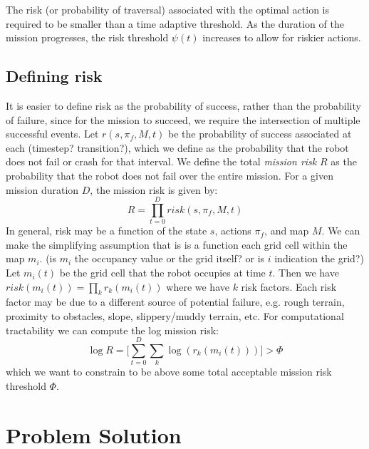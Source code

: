 \documentclass[letterpaper, 10 pt, conference]{ieeeconf}  %
\begin{document}
\noindent The risk (or probability of traversal) associated with the optimal action is required to be smaller than a time adaptive threshold. As the duration of the mission progresses, the risk threshold $\psi(t)$ increases to allow for riskier actions.


\subsection{Defining risk}
It is easier to define risk as the probability of success, rather than the probability of failure, since for the mission to succeed, we require the intersection of multiple successful events.  Let $r(s,\pi_f,M,t)$ be the probability of success associated at each (timestep?  transition?), which we define as the probability that the robot does not fail or crash for that interval.  We define the total \emph{mission risk} $R$ as the probability that the robot does not fail over the entire mission.  For a given mission duration $D$, the mission risk is given by:
\begin{equation}
    R= \prod_{t=0}^D risk(s,\pi_f,M,t)
\end{equation}
In general, risk may be a function of the state $s$, actions $\pi_f$, and map $M$.  We can make the simplifying assumption that is is a function each grid cell within the map $m_i$.  (is $m_i$ the occupancy value or the grid itself?  or is $i$ indication the grid?)  Let $m_i(t)$ be the grid cell that the robot occupies at time $t$.  Then we have $risk(m_i(t)) = \prod_{k} r_k(m_i(t))$ where we have $k$ risk factors.  Each risk factor may be due to a different source of potential failure, e.g. rough terrain, proximity to obstacles, slope, slippery/muddy terrain, etc.  For computational tractability we can compute the log mission risk: 
\begin{equation}
    \log R=\bigg[\sum_{t=0}^D\sum_{k} \log(r_k(m_i(t)))\bigg] > \Phi
\end{equation}
which we want to constrain to be above some total acceptable mission risk threshold $\Phi$.
\section{Problem Solution}
\end{document}
